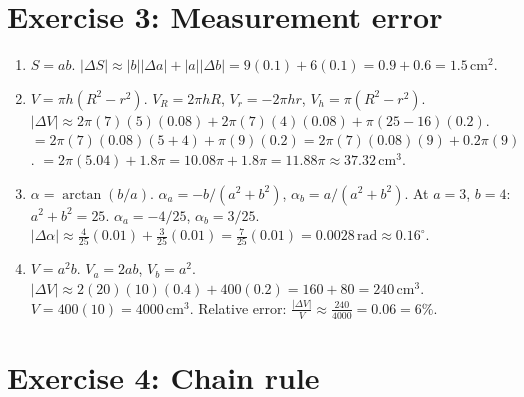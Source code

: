\documentclass[12pt,a4paper]{article}
\begin{document}
\section*{Exercise 3: Measurement error}

\begin{enumerate}[leftmargin=*, label=(\alph*)]

\item $S=ab$. $|\Delta S|\approx|b||\Delta a|+|a||\Delta b|=9(0.1)+6(0.1)=0.9+0.6=1.5\,\text{cm}^2$.

\item $V=\pi h(R^2-r^2)$. $V_R=2\pi hR$, $V_r=-2\pi hr$, $V_h=\pi(R^2-r^2)$.
$|\Delta V|\approx 2\pi(7)(5)(0.08)+2\pi(7)(4)(0.08)+\pi(25-16)(0.2)$.
$=2\pi(7)(0.08)(5+4)+\pi(9)(0.2)=2\pi(7)(0.08)(9)+0.2\pi(9)$.
$=2\pi(5.04)+1.8\pi=10.08\pi+1.8\pi=11.88\pi\approx 37.32\,\text{cm}^3$.

\item $\alpha=\arctan(b/a)$. $\alpha_a=-b/(a^2+b^2)$, $\alpha_b=a/(a^2+b^2)$.
At $a=3$, $b=4$: $a^2+b^2=25$. $\alpha_a=-4/25$, $\alpha_b=3/25$.
$|\Delta\alpha|\approx\frac{4}{25}(0.01)+\frac{3}{25}(0.01)=\frac{7}{25}(0.01)=0.0028\,\text{rad}\approx 0.16^{\circ}$.

\item $V=a^2b$. $V_a=2ab$, $V_b=a^2$.
$|\Delta V|\approx 2(20)(10)(0.4)+400(0.2)=160+80=240\,\text{cm}^3$.
$V=400(10)=4000\,\text{cm}^3$.
Relative error: $\frac{|\Delta V|}{V}\approx\frac{240}{4000}=0.06=6\%$.

\end{enumerate}

\section*{Exercise 4: Chain rule}
\end{document}

